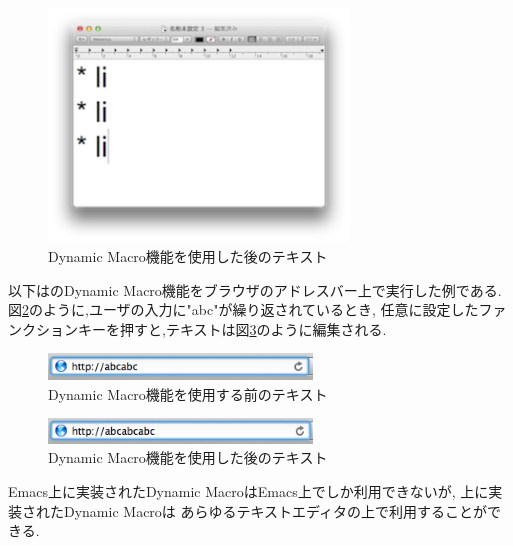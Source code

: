 \begin{figure}[H]
\centerline{\includegraphics[width=80mm,bb=0 0 360 220]{figures/dynamic2.png}}
\caption{Dynamic Macro機能を使用した後のテキスト}
\label{dynamic2}
\end{figure}


以下は{\system}のDynamic Macro機能をブラウザのアドレスバー上で実行した例である.
図\ref{dynamic3}のように,ユーザの入力に"abc"が繰り返されているとき,
任意に設定したファンクションキーを押すと,テキストは図\ref{dynamic4}のように編集される.

\begin{figure}[H]
\centerline{\includegraphics[width=70mm,bb=0 0 360 50]{figures/dynamic3.png}}
\caption{Dynamic Macro機能を使用する前のテキスト}
\label{dynamic3}
\end{figure}

\begin{figure}[H]
\centerline{\includegraphics[width=70mm,bb=0 0 360 50]{figures/dynamic4.png}}
\caption{Dynamic Macro機能を使用した後のテキスト}
\label{dynamic4}
\end{figure}

Emacs上に実装されたDynamic MacroはEmacs上でしか利用できないが,
{\system}上に実装されたDynamic Macroは
あらゆるテキストエディタの上で利用することができる.


